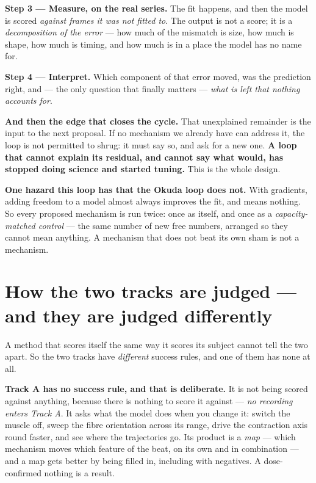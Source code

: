 \documentclass[11pt,a4paper]{article}
\begin{document}
\textbf{Step 3 --- Measure, on the real series.} The fit happens, and then the model is scored
\emph{against frames it was not fitted to}. The output is not a score; it is a \emph{decomposition
of the error} --- how much of the mismatch is size, how much is shape, how much is timing, and how
much is in a place the model has no name for.

\textbf{Step 4 --- Interpret.} Which component of that error moved, was the prediction right, and
--- the only question that finally matters --- \emph{what is left that nothing accounts for}.

\textbf{And then the edge that closes the cycle.} That unexplained remainder is the input to the next
proposal. If no mechanism we already have can address it, the loop is not permitted to shrug: it
must say so, and ask for a new one. \textbf{A loop that cannot explain its residual, and cannot say
what would, has stopped doing science and started tuning.} This is the whole design.

\textbf{One hazard this loop has that the Okuda loop does not.} With gradients, adding freedom to a
model almost always improves the fit, and means nothing. So every proposed mechanism is run twice:
once as itself, and once as a \emph{capacity-matched control} --- the same number of new free
numbers, arranged so they cannot mean anything. A mechanism that does not beat its own sham is not a
mechanism.

\section{How the two tracks are judged --- and they are judged differently}

A method that scores itself the same way it scores its subject cannot tell the two apart. So the
two tracks have \emph{different} success rules, and one of them has none at all.

\textbf{Track A has no success rule, and that is deliberate.} It is not being scored against
anything, because there is nothing to score it against --- \emph{no recording enters Track A}. It
asks what the model does when you change it: switch the muscle off, sweep the fibre orientation
across its range, drive the contraction axis round faster, and see where the trajectories go. Its
product is a \emph{map} --- which mechanism moves which feature of the beat, on its own and in
combination --- and a map gets better by being filled in, including with negatives. A dose-confirmed
nothing is a result.
\end{document}
